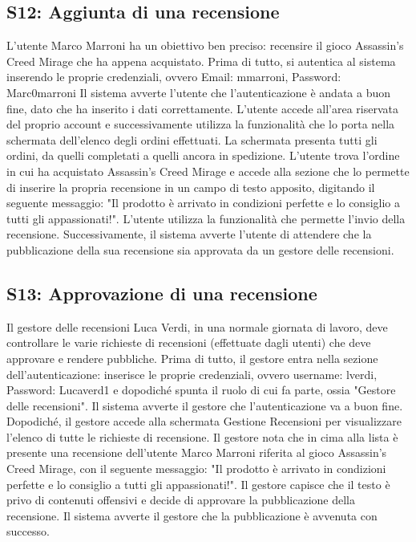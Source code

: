 \documentclass[12pt, a4paper, oneside]{book}
\begin{document}
    \subsection*{S12: Aggiunta di una recensione}
        L'utente Marco Marroni ha un obiettivo ben preciso: recensire il gioco Assassin's Creed Mirage che ha appena acquistato.
        Prima di tutto, si autentica al sistema inserendo le proprie credenziali, ovvero Email: mmarroni, Password: Marc0marroni
        Il sistema avverte l'utente che l'autenticazione è andata a buon fine, dato che ha inserito i dati correttamente.
        L'utente accede all'area riservata del proprio account e successivamente utilizza la funzionalità
        che lo porta nella schermata dell'elenco degli ordini effettuati. La schermata presenta tutti gli ordini,
        da quelli completati a quelli ancora in spedizione. L'utente trova l'ordine in cui ha acquistato
        Assassin's Creed Mirage e accede alla sezione che lo permette di inserire la propria recensione
        in un campo di testo apposito, digitando il seguente messaggio: "Il prodotto è arrivato in condizioni perfette
        e lo consiglio a tutti gli appassionati!". L'utente utilizza la funzionalità che permette l'invio della recensione.
        Successivamente, il sistema avverte l'utente di attendere che la pubblicazione della sua recensione sia approvata
        da un gestore delle recensioni.

    \subsection*{S13: Approvazione di una recensione}
        Il gestore delle recensioni Luca Verdi, in una normale giornata di lavoro, deve controllare le varie richieste
        di recensioni (effettuate dagli utenti) che deve approvare e rendere pubbliche.
        Prima di tutto, il gestore entra nella sezione dell'autenticazione: inserisce le proprie credenziali, ovvero username: lverdi, Password: Lucaverd1
        e dopodiché spunta il ruolo di cui fa parte, ossia "Gestore delle recensioni".
        Il sistema avverte il gestore che l'autenticazione va a buon fine. Dopodiché, il gestore accede alla schermata
        Gestione Recensioni per visualizzare l'elenco di tutte le richieste di recensione. Il gestore nota che in cima
        alla lista è presente una recensione dell'utente Marco Marroni riferita al gioco Assassin's Creed Mirage,
        con il seguente messaggio: "Il prodotto è arrivato in condizioni perfette e lo consiglio a tutti gli appassionati!".
        Il gestore capisce che il testo è privo di contenuti offensivi e decide di approvare la pubblicazione della recensione.
        Il sistema avverte il gestore che la pubblicazione è avvenuta con successo.
\end{document}
